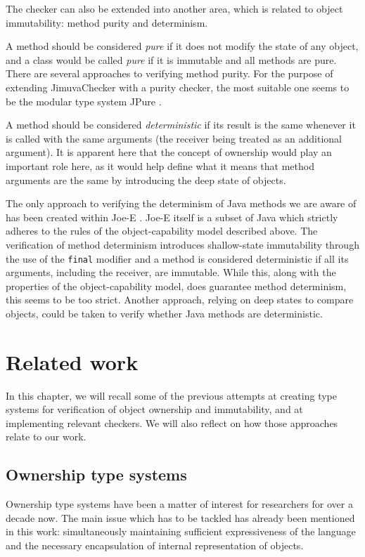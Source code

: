 \documentclass{pracamgr}
\theoremstyle{break}
\theoremstyle{break}
\theoremstyle{break}
\begin{document}
The checker can also be extended into another area, which is related
to object immutability: method purity and determinism. 

A method should be considered \emph{pure} if it does not modify the
state of any object, and a class would be called \emph{pure} if it is
immutable and all methods are pure. There are several approaches to
verifying method purity. For the purpose of extending JimuvaChecker
with a purity checker, the most suitable one seems to be the modular
type system JPure \cite{jpure}.

A method should be considered \emph{deterministic} if its result is
the same whenever it is called with the same arguments (the receiver
being treated as an additional argument). It is apparent here that the
concept of ownership would play an important role here, as it would
help define what it means that method arguments are the same by
introducing the deep state of objects. 

The only approach to verifying the determinism of Java methods we
are aware of has been created within Joe-E \cite{deterministic}. Joe-E
itself is a subset of Java which strictly adheres to the rules of the
object-capability model described above. The verification of method
determinism introduces shallow-state immutability through the use of
the \texttt{final} modifier and a method is considered deterministic
if all its arguments, including the receiver, are immutable. While
this, along with the properties of the object-capability model, does
guarantee method determinism, this seems to be too strict. Another
approach, relying on deep states to compare objects, could be taken to
verify whether Java methods are deterministic.

\chapter{Related work}
\label{chap:related}

In this chapter, we will recall some of the previous attempts at
creating type systems for verification of object ownership and
immutability, and at implementing relevant checkers. We will also
reflect on how those approaches relate to our work.

\section{Ownership type systems}
\label{sec:rel:ownership}

Ownership type systems have been a matter of interest for researchers
for over a decade now. The main issue which has to be tackled has
already been mentioned in this work: simultaneously maintaining
sufficient expressiveness of the language and the necessary
encapsulation of internal representation of objects. 
\end{document}
